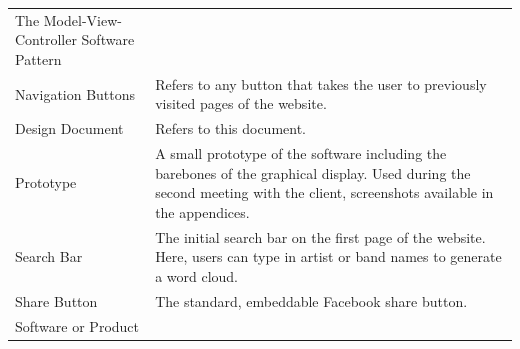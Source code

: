 \documentclass[]{article}
\begin{document}
\begin{longtable}[c]{@{}ll@{}}
\begin{minipage}[t]{0.47\columnwidth}
The Model-View-Controller Software Pattern
\end{minipage}
\\\addlinespace
\begin{minipage}[t]{0.47\columnwidth}\raggedright
Navigation Buttons
\end{minipage} & \begin{minipage}[t]{0.47\columnwidth}\raggedright
Refers to any button that takes the user to previously visited pages of
the website.
\end{minipage}
\\\addlinespace
\begin{minipage}[t]{0.47\columnwidth}\raggedright
Design Document
\end{minipage} & \begin{minipage}[t]{0.47\columnwidth}\raggedright
Refers to this document.
\end{minipage}
\\\addlinespace
\begin{minipage}[t]{0.47\columnwidth}\raggedright
Prototype
\end{minipage} & \begin{minipage}[t]{0.47\columnwidth}\raggedright
A small prototype of the software including the barebones of the
graphical display. Used during the second meeting with the client,
screenshots available in the appendices.
\end{minipage}
\\\addlinespace
\begin{minipage}[t]{0.47\columnwidth}\raggedright
Search Bar
\end{minipage} & \begin{minipage}[t]{0.47\columnwidth}\raggedright
The initial search bar on the first page of the website. Here, users can
type in artist or band names to generate a word cloud.
\end{minipage}
\\\addlinespace
\begin{minipage}[t]{0.47\columnwidth}\raggedright
Share Button
\end{minipage} & \begin{minipage}[t]{0.47\columnwidth}\raggedright
The standard, embeddable Facebook share button.
\end{minipage}
\\\addlinespace
\begin{minipage}[t]{0.47\columnwidth}\raggedright
Software or Product
\end{minipage} & \begin{minipage}[t]{0.47\columnwidth}\raggedright

\end{minipage}
\end{longtable}
\end{document}
